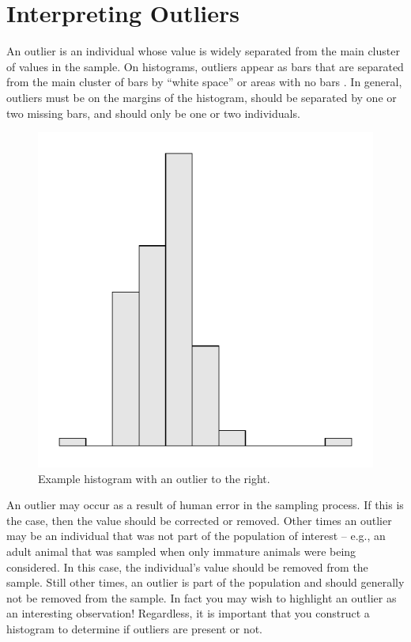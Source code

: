 \documentclass[10pt,openany]{book}\usepackage[]{graphicx}\usepackage[]{color}
\newenvironment{knitrout}{}{} %
\begin{document}
\vspace{-12pt}


\section{Interpreting Outliers}
\vspace{-12pt}
An outlier is an individual whose value is widely separated from the main cluster of values in the sample.  On histograms, outliers appear as bars that are separated from the main cluster of bars by ``white space'' or areas with no bars .  In general, outliers must be on the margins of the histogram, should be separated by one or two missing bars, and should only be one or two individuals.

\begin{knitrout}
\color{fgcolor}\begin{figure}[hbtp]

{\centering \includegraphics[width=.4\linewidth]{Figs/OutlierExHist-1} 

}

\caption[Example histogram with an outlier to the right]{Example histogram with an outlier to the right.}\label{fig:OutlierExHist}
\end{figure}


\end{knitrout}


An outlier may occur as a result of human error in the sampling process.  If this is the case, then the value should be corrected or removed.  Other times an outlier may be an individual that was not part of the population of interest -- e.g., an adult animal that was sampled when only immature animals were being considered.  In this case, the individual's value should be removed from the sample.  Still other times, an outlier is part of the population and should generally not be removed from the sample. In fact you may wish to highlight an outlier as an interesting observation! Regardless, it is important that you construct a histogram to determine if outliers are present or not.
\end{document}
